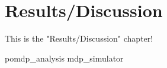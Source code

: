 \chapter{Results/Discussion}

This is the "Results/Discussion" chapter!

{pomdp_analysis}
{mdp_simulator}
